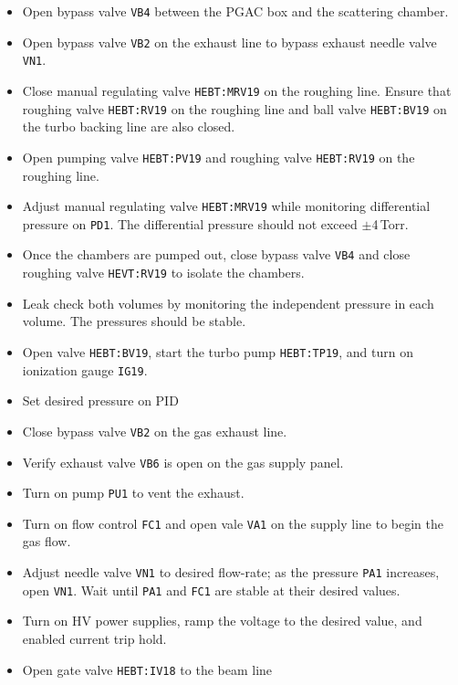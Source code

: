 \begin{itemize}
\setlength{\itemsep}{0pt}
\setlength{\parskip}{0pt}
\setlength{\parsep}{0pt}
\item Open bypass valve \texttt{VB4} between the PGAC box and the scattering chamber.
\item Open bypass valve \texttt{VB2} on the exhaust line to bypass exhaust needle valve \texttt{VN1}.
\item Close manual regulating valve \texttt{HEBT:MRV19} on the roughing line.   Ensure that roughing valve \texttt{HEBT:RV19} on the roughing line and ball valve \texttt{HEBT:BV19} on the turbo backing line are also closed.
\item Open pumping valve \texttt{HEBT:PV19} and roughing valve \texttt{HEBT:RV19} on the roughing line.
\item Adjust manual regulating valve \texttt{HEBT:MRV19}  while monitoring differential pressure on \texttt{PD1}.  The differential pressure should not exceed $\pm$4\,Torr.
\item Once the chambers are pumped out, close bypass valve \texttt{VB4} and close roughing valve \texttt{HEVT:RV19} to isolate the chambers.
\item Leak check both volumes by monitoring the independent pressure in each volume.  The pressures should be stable.
\item Open valve \texttt{HEBT:BV19}, start the turbo pump \texttt{HEBT:TP19}, and turn on ionization gauge \texttt{IG19}.
\item Set desired pressure on PID
\item Close bypass valve \texttt{VB2} on the gas exhaust line. %
\item Verify exhaust valve  \texttt{VB6} is open on the gas supply panel.
\item Turn on pump \texttt{PU1} to vent the exhaust.
\item Turn on flow control \texttt{FC1} and open vale \texttt{VA1} on the supply line to begin the gas flow.
\item Adjust needle valve \texttt{VN1} to desired flow-rate; as the pressure \texttt{PA1} increases, open \texttt{VN1}. Wait until \texttt{PA1} and \texttt{FC1} are stable at their desired values.
\item Turn on HV power supplies, ramp the voltage to the desired value, and enabled current trip hold.
\item Open gate valve \texttt{HEBT:IV18} to the beam line
\end{itemize}
